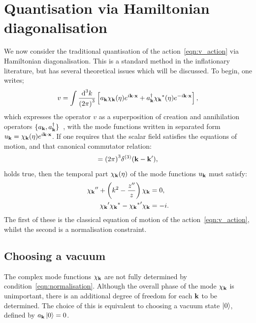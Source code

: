 \section{Quantisation via Hamiltonian diagonalisation}                                
\label{sec:mukhanov}
We now consider the traditional quantisation of the action~\eqref{eqn:v_action} via Hamiltonian diagonalisation. This is a standard method in the inflationary literature, but has several theoretical issues which will be discussed. To begin, one writes;
\begin{equation}
  v = \int \frac{\d[3]{k}}{{(2\pi)}^3} \left[ a_\vk \chi_\vk(\eta)e^{i\vk\cdot\vx} + a_{\vk}^{\dagger} \str{\chi_\vk}(\eta)e^{-i\vk\cdot\vx} \right], 
  \label{eqn:v_quant}
\end{equation}
which expresses the operator $v$ as a superposition of creation and annihilation operators $\{a_{\mathbf{k}},a_{\mathbf{k}}^\dagger\}$~\cite{Mukhanov+2007}, with the mode functions written in separated form ${u_{\mathbf{k}} = \chi_{\mathbf{k}}(\eta) e^{i\mathbf{k}\cdot\mathbf{x}}}$. If one requires that the scalar field satisfies the equations of motion, and that canonical commutator relation:
\begin{equation}
  [ a_\vk^{\phantom\dagger} a_{\prm{\vk}}^{\dagger} ] = {(2\pi)}^3\delta^{(3)}(\vk-\prm{\vk}),
  \label{eqn:commutator}
\end{equation}
holds true, then the temporal part $\chi_{\mathbf{k}}(\eta)$ of the mode functions $u_{\mathbf{k}}$ must satisfy:
\begin{align}
  \dprm{\chi_\vk} + \left( k^2 - \frac{\dprm{z}}{z} \right)\chi_\vk &= 0,
  \label{eqn:mode_mukhanov}
  \\
  \prm{\chi_\vk} \str{\chi_\vk} - \prm{\str{\chi_\vk}} \chi_\vk &= -i.
  \label{eqn:normalisation}
\end{align}
The first of these is the classical equation of motion of the action~\eqref{eqn:v_action}, whilst the second is a normalisation constraint.

\subsection{Choosing a vacuum}
\label{sec:hamiltonian_diagonalisation}
The complex mode functions $\chi_{\mathbf{k}}$ are not fully determined by condition~\eqref{eqn:normalisation}. Although the overall phase of the mode $\chi_{\mathbf{k}}$ is unimportant, there is an additional degree of freedom for each $\mathbf{k}$ to be determined. The choice of this is equivalent to choosing a vacuum state $\left|0\right\rangle$, defined by $a_{\mathbf{k}}\left|0\right\rangle=0$.

